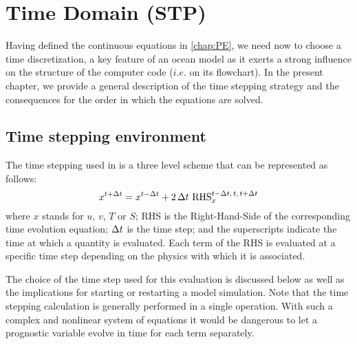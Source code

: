 \documentclass[../main/NEMO_manual]{subfiles}
\begin{document}
\chapter{Time Domain (STP) }
\label{chap:STP}

\minitoc



\newpage

Having defined the continuous equations in \autoref{chap:PE}, we need now to choose a time discretization,
a key feature of an ocean model as it exerts a strong influence on the structure of the computer code
($i.e.$ on its flowchart).
In the present chapter, we provide a general description of the \NEMO time stepping strategy and
the consequences for the order in which the equations are solved.

\section{Time stepping environment}
\label{sec:STP_environment}

The time stepping used in \NEMO is a three level scheme that can be represented as follows:
\begin{equation}
  \label{eq:STP}
  x^{t+\Delta t} = x^{t-\Delta t} + 2 \, \Delta t \  \text{RHS}_x^{t-\Delta t,\,t,\,t+\Delta t}
\end{equation} 
where $x$ stands for $u$, $v$, $T$ or $S$;
RHS is the Right-Hand-Side of the corresponding time evolution equation;
$\Delta t$ is the time step;
and the superscripts indicate the time at which a quantity is evaluated.
Each term of the RHS is evaluated at a specific time step depending on the physics with which it is associated.

The choice of the time step used for this evaluation is discussed below as well as
the implications for starting or restarting a model simulation.
Note that the time stepping calculation is generally performed in a single operation.
With such a complex and nonlinear system of equations it would be dangerous to let a prognostic variable evolve in
time for each term separately.
\end{document}
